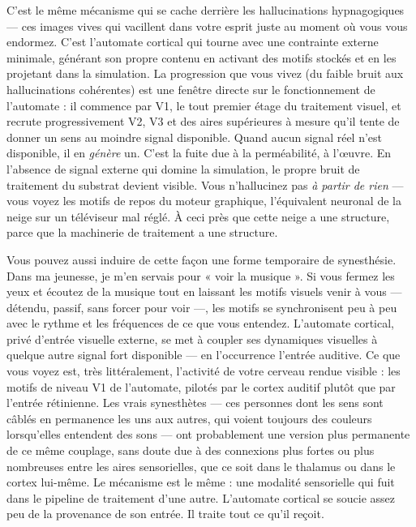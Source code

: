 \documentclass[11pt, twoside, openright]{book}
\begin{document}
C'est le même mécanisme qui se cache derrière les hallucinations hypnagogiques --- ces images vives qui vacillent dans votre esprit juste au moment où vous vous endormez. C'est l'automate cortical qui tourne avec une contrainte externe minimale, générant son propre contenu en activant des motifs stockés et en les projetant dans la simulation. La progression que vous vivez (du faible bruit aux hallucinations cohérentes) est une fenêtre directe sur le fonctionnement de l'automate : il commence par V1, le tout premier étage du traitement visuel, et recrute progressivement V2, V3 et des aires supérieures à mesure qu'il tente de donner un sens au moindre signal disponible. Quand aucun signal réel n'est disponible, il en \textit{génère} un. C'est la fuite due à la perméabilité, à l'œuvre. En l'absence de signal externe qui domine la simulation, le propre bruit de traitement du substrat devient visible. Vous n'hallucinez pas \textit{à partir de rien} --- vous voyez les motifs de repos du moteur graphique, l'équivalent neuronal de la neige sur un téléviseur mal réglé. À ceci près que cette neige a une structure, parce que la machinerie de traitement a une structure.

Vous pouvez aussi induire de cette façon une forme temporaire de synesthésie. Dans ma jeunesse, je m'en servais pour « voir la musique ». Si vous fermez les yeux et écoutez de la musique tout en laissant les motifs visuels venir à vous --- détendu, passif, sans forcer pour voir ---, les motifs se synchronisent peu à peu avec le rythme et les fréquences de ce que vous entendez. L'automate cortical, privé d'entrée visuelle externe, se met à coupler ses dynamiques visuelles à quelque autre signal fort disponible --- en l'occurrence l'entrée auditive. Ce que vous voyez est, très littéralement, l'activité de votre cerveau rendue visible : les motifs de niveau V1 de l'automate, pilotés par le cortex auditif plutôt que par l'entrée rétinienne. Les vrais synesthètes --- ces personnes dont les sens sont câblés en permanence les uns aux autres, qui voient toujours des couleurs lorsqu'elles entendent des sons --- ont probablement une version plus permanente de ce même couplage, sans doute due à des connexions plus fortes ou plus nombreuses entre les aires sensorielles, que ce soit dans le thalamus ou dans le cortex lui-même. Le mécanisme est le même : une modalité sensorielle qui fuit dans le pipeline de traitement d'une autre. L'automate cortical se soucie assez peu de la provenance de son entrée. Il traite tout ce qu'il reçoit.
\end{document}

